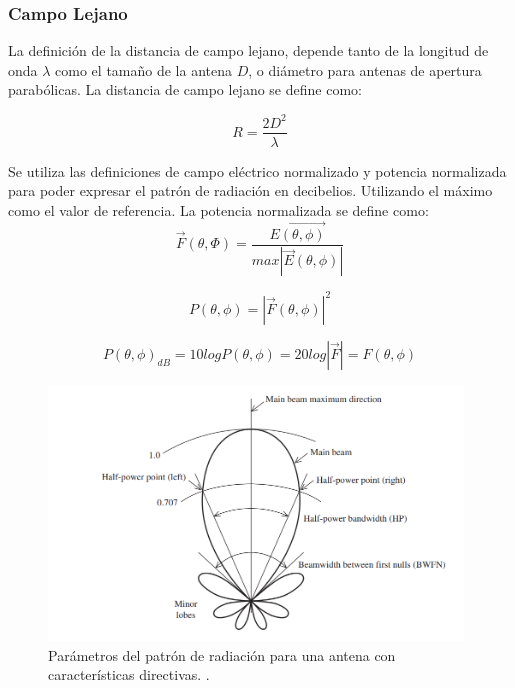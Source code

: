 \subsubsection*{Campo Lejano} La definición de la distancia de campo lejano, depende tanto de la longitud de onda $\lambda$ como el tamaño de la antena $D$, o diámetro para antenas de apertura parabólicas. La distancia de campo lejano se define como:

\begin{equation}
    R = \frac{2D^2}{\lambda}
\end{equation}

Se utiliza las definiciones de campo eléctrico normalizado y potencia normalizada para poder expresar el patrón de radiación en decibelios. Utilizando el máximo como el valor de referencia. La potencia normalizada se define como:\\

\begin{equation}
    \Vec{F}(\theta, \Phi)=\frac{\Vec{E(\theta, \phi)}}{max|\Vec{E}(\theta, \phi)|}
\end{equation}

\begin{equation}
    P(\theta, \phi) = |\Vec{F}(\theta, \phi)|^{2}
\end{equation}

\begin{equation}
    P(\theta, \phi)_{dB} = 10logP(\theta, \phi)=20log |\Vec{F}|=F(\theta, \phi)
\end{equation}


\begin{figure}
    \centering
    \includegraphics[width = 11cm]{img/patern1.png}
    \caption{Parámetros del patrón de radiación para una antena con características directivas. \cite{stutzman2012antenna}.}
    \label{fig:patern}
\end{figure}

